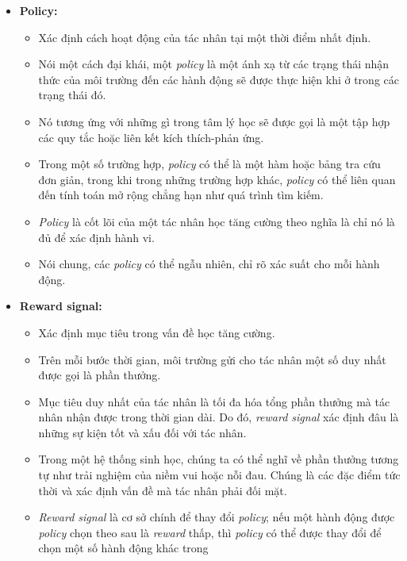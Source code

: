 \begin{itemize}
    \item \textbf{Policy:}
    \begin{itemize}
        \item Xác định cách hoạt động của tác nhân tại một thời điểm
        nhất định.
        \item Nói một cách đại khái, một \textit{policy} là một ánh xạ
        từ các trạng thái nhận thức của môi trường đến các hành động
        sẽ được thực hiện khi ở trong các trạng thái đó.
        \item Nó tương ứng với những gì trong tâm lý học sẽ được gọi là
        một tập hợp các quy tắc hoặc liên kết kích thích-phản ứng.
        \item Trong một số trường hợp, \textit{policy} có thể là một hàm
        hoặc bảng tra cứu đơn giản, trong khi trong những trường hợp khác,
        \textit{policy} có thể liên quan đến tính toán mở rộng
        chẳng hạn như quá trình tìm kiếm.
        \item \textit{Policy} là cốt lõi của một tác nhân học tăng cường
        theo nghĩa là chỉ nó là đủ để xác định hành vi.
        \item Nói chung, các \textit{policy} có thể ngẫu nhiên,
        chỉ rõ xác suất cho mỗi hành động.
    \end{itemize}
    \item \textbf{Reward signal:}
    \begin{itemize}
        \item Xác định mục tiêu trong vấn đề học tăng cường.
        \item Trên mỗi bước thời gian, môi trường gửi cho tác nhân
        một số duy nhất được gọi là phần thưởng.
        \item Mục tiêu duy nhất của tác nhân là tối đa hóa
        tổng phần thưởng mà tác nhân nhận được trong thời gian dài.
        Do đó, \textit{reward signal} xác định đâu là những sự kiện
        tốt và xấu đối với tác nhân.
        \item Trong một hệ thống sinh học, chúng ta có thể nghĩ
        về phần thưởng tương tự như trải nghiệm của niềm vui hoặc
        nỗi đau. Chúng là các đặc điểm tức thời và xác định vấn đề
        mà tác nhân phải đối mặt.
        \item \textit{Reward signal} là cơ sở chính để thay đổi
        \textit{policy}; nếu một hành động được \textit{policy}
        chọn theo sau là \textit{reward} thấp, thì \textit{policy}
        có thể được thay đổi để chọn một số hành động khác trong

\end{itemize}
\end{itemize}
